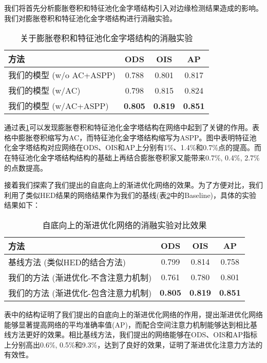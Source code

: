 \documentclass[master]{thesis-uestc}
\begin{document}
{我们将首先分析膨胀卷积和特征池化金字塔结构引入对边缘检测结果造成的影响。我们对膨胀卷积和特征池化金字塔结构进行消融实验。
\begin{table}[h!]
	\begin{center}
		\caption{关于膨胀卷积和特征池化金字塔结构的消融实验}
		\label{tab:ac_aspp}
		\begin{tabular}{l|c|c|c}
			\toprule %
			\textbf{方法} & \textbf{ODS} & \textbf{OIS} & \textbf{AP}\\
			\midrule %
			我们的模型 (w/o AC+ASPP) & 0.788&0.801&0.817\\   
			我们的模型 (w/AC) & 0.798 & 0.815 &0.824\\
			我们的模型 (w/AC+ASPP) & \textbf{0.805} &\textbf{0.819} & \textbf{0.851}\\
			\bottomrule %
		\end{tabular}
	\end{center}
\end{table}

通过表\ref{tab:ac_aspp}可以发现膨胀卷积和特征池化金字塔结构在网络中起到了关键的作用。表格中膨胀卷积缩写为AC，而特征池化金字塔结构缩写为ASPP。图中表明特征池化金字塔结构对应网络在ODS、OIS和AP上分别有1\%、1.4\%和0.7\%点的提高。而在特征池化金字塔结构结构的基础上再结合膨胀卷积家又能带来0.7\%, 0.4\%, 2.7\%的点数提高。

接着我们探索了我们提出的自底向上的渐进优化网络的效果。为了方便对比，我们利用了类似HED结果的网络结果作为我们的基线(表\ref{tab:CRA}中的Baseline)，具体的实验结果如下：
\begin{table}[h!]
	\begin{center}
		\caption{自底向上的渐进优化网络的消融实验对比效果}
		\label{tab:CRA}
		\begin{tabular}{l|c|c|c}
			\toprule %
			\textbf{方法} & \textbf{ODS} & \textbf{OIS} & \textbf{AP}\\
			\midrule %
			基线方法 (类似HED的结合方法) & 0.799&0.814&0.758\\   
			我们的方法 (渐进优化-不含注意力机制) & 0.761 & 0.780 &0.801\\
			我们的方法  (渐进优化-包含注意力机制) & \textbf{0.805} &\textbf{0.819} & \textbf{0.851}\\
			\bottomrule %
		\end{tabular}
	\end{center}
\end{table}

表中的结构证明了我们提出的自底向上的渐进优化网络的作用，提出渐进优化网络能够显著提高网络的平均准确率值(AP)，而配合空间注意力机制能够达到相比基线方法更好的效果。相比基线方法，我们提出的网络能够在ODS、OIS和AP指标上分别高出0.6\%, 0.5\%和9.3\%，达到了良好的效果，证明了渐进优化注意力方法的有效性。

}
\end{document}
